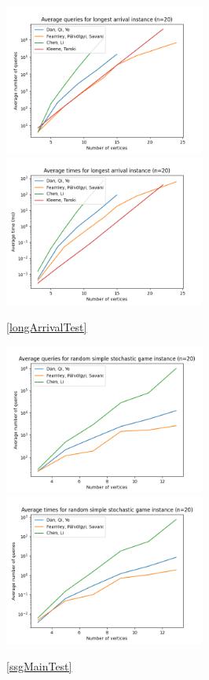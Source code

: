   \vspace{-22pt}
  \begin{figure}[H]
      \centering
      \includegraphics[width=2.6in]{plots/arrival_long_queries.png}
      \centering
      \includegraphics[width=2.6in]{plots/arrival_long_time.png}
      \caption{\cref{longArrivalTest}} \label{arrivalLongPlot}
  \end{figure}
  \vspace{-22pt}
  \begin{figure}[H] 
      \centering
      \includegraphics[width=2.6in]{plots/simple_queries.png}
      \centering
      \includegraphics[width=2.6in]{plots/simple_time.png}
      \caption{\cref{ssgMainTest}} \label{simpleMainPlot}
  \end{figure}
